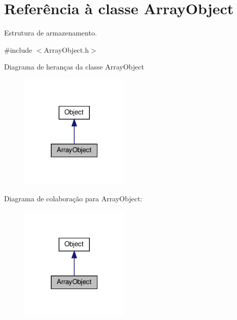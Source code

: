 \hypertarget{classArrayObject}{}\section{Referência à classe Array\+Object}
\label{classArrayObject}


Estrutura de armazenamento.  




{\ttfamily \#include $<$Array\+Object.\+h$>$}



Diagrama de heranças da classe Array\+Object\nopagebreak
\begin{figure}[H]
\begin{center}
\leavevmode
\includegraphics[width=148pt]{classArrayObject__inherit__graph}
\end{center}
\end{figure}


Diagrama de colaboração para Array\+Object\+:\nopagebreak
\begin{figure}[H]
\begin{center}
\leavevmode
\includegraphics[width=148pt]{classArrayObject__coll__graph}
\end{center}
\end{figure}
